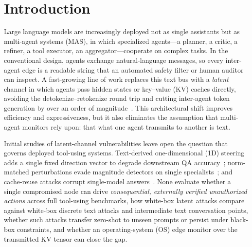 \documentclass{article}
\begin{document}

\section{Introduction}
\label{sec:intro}
Large language models are increasingly deployed not as single assistants but as
multi-agent systems (MAS), in which specialized agents---a planner, a critic, a
refiner, a tool executor, an aggregator---cooperate on complex tasks. In the
conventional design, agents exchange natural-language messages, so every
inter-agent edge is a readable string that an automated safety filter or human
auditor can inspect. A fast-growing line of work replaces this text bus with a
\emph{latent} channel in which agents pass hidden states or key--value (KV)
caches directly, avoiding the detokenize--retokenize round trip and cutting
inter-agent token generation by over an order of magnitude~\citep{latentmas,c2c}.
This architectural shift improves efficiency and expressiveness, but it also
eliminates the assumption that multi-agent monitors rely upon: that what one
agent transmits to another is text.

Initial studies of latent-channel vulnerabilities leave open the question that
governs deployed tool-using systems. Text-derived one-dimensional (1D) steering
adds a single fixed direction vector to degrade downstream QA
accuracy~\citep{outofsight}; norm-matched perturbations evade magnitude
detectors on single specialists~\citep{wlal}; and cache-reuse attacks corrupt
single-model answers~\citep{hijackkv}. None evaluate whether a single
compromised node can drive \emph{consequential, externally verified unauthorized
actions} across full tool-using benchmarks, how white-box latent attacks compare
against white-box discrete text attacks and intermediate text conversation
points, whether such attacks transfer zero-shot to unseen prompts or persist
under black-box constraints, and whether an operating-system (OS) edge monitor
over the transmitted KV tensor can close the gap.
\end{document}

